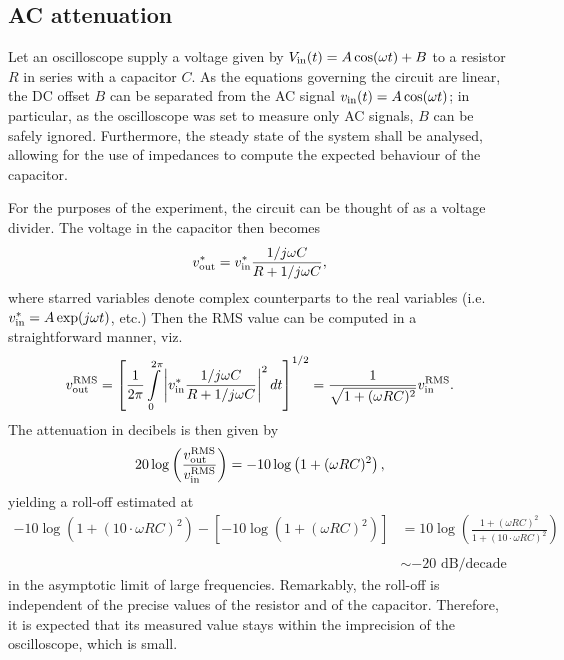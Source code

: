 \documentclass{article}
\begin{document}
\subsection{AC attenuation}
Let an oscilloscope supply a voltage given by $V_{\text{in}}(t) = A\cos(\omega t) + B$ to a resistor $R$ in series with a capacitor $C$. As the equations governing the circuit are linear, the DC offset $B$ can be separated from the AC signal $v_{\text{in}}(t) = A\cos(\omega t)$; in particular, as the oscilloscope was set to measure only AC signals, $B$ can be safely ignored. Furthermore, the steady state of the system shall be analysed, allowing for the use of impedances to compute the expected behaviour of the capacitor.
\par For the purposes of the experiment, the circuit can be thought of as a voltage divider. The voltage in the capacitor then becomes
\begin{equation*}
    v_{\text{out}}^*= v_{\text{in}}^*\frac{1/j\omega C}{R + 1/j\omega C},
\end{equation*}
where starred variables denote complex counterparts to the real variables (i.e. $v_{\text{in}}^* = A\exp(j\omega t)$, etc.) Then the RMS value can be computed in a straightforward manner, viz.
\begin{equation*}
        v_{\text{out}}^{\text{RMS}} = \left[\frac{1}{2\pi}\int\limits_0^{2\pi}\left|v_{\text{in}}^*\frac{1/j\omega C}{R + 1/j\omega C}\right|^2dt\right]^{1/2} = \frac{1}{\sqrt{1 + (\omega RC)^2}} v_{\text{in}}^{\text{RMS}}.
\end{equation*}
The attenuation in decibels is then given by
\begin{equation}
    20\log\left(\frac{v_{\text{out}}^{\text{RMS}}}{v_{\text{in}}^{\text{RMS}}}\right) = -10\log\left(1 + (\omega RC)^2\right),
    \label{eqn:ac_plot}
\end{equation}
yielding a roll-off estimated at
\begin{equation}
\begin{split}
        -10\log\left(1 + (10\cdot\omega RC)^2\right) - \left[-10\log\left(1 + (\omega RC)^2\right)\right] &= 10\log \left(\frac{1 + (\omega RC)^2}{1 + (10\cdot\omega RC)^2} \right)\\
        \\
        &\sim-20 \text{ dB/decade}
\end{split}
\label{eqn:roll_off}
\end{equation}
in the asymptotic limit of large frequencies. Remarkably, the roll-off is independent of the precise values of the resistor and of the capacitor. Therefore, it is expected that its measured value stays within the imprecision of the oscilloscope, which is small. 
\end{document}
